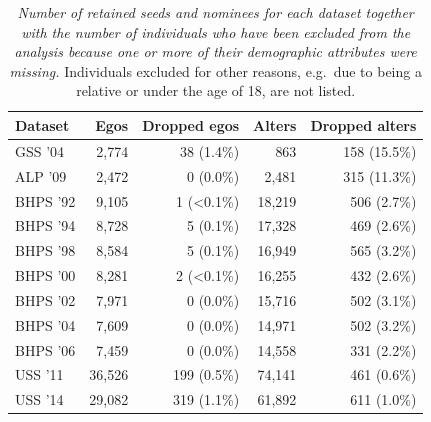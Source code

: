 \documentclass{scrartcl}
\newcommand{\titlecaption}[2]{\caption[#1]{\emph{#1} #2}}
\begin{document}
\begin{refsection}
\begin{table}
    \begin{tabularx}{\columnwidth}{lrrrr}
        \toprule %
        Dataset & Egos & Dropped egos & Alters & Dropped alters \\
        \midrule %
        GSS '04 & 2,774 & 38 (1.4\%) & 863 & 158 (15.5\%)\\
        ALP '09 & 2,472 & 0 (0.0\%) & 2,481 & 315 (11.3\%)\\
        BHPS '92 & 9,105 & 1 (\textless 0.1\%) & 18,219 & 506 (2.7\%)\\
        BHPS '94 & 8,728 & 5 (0.1\%) & 17,328 & 469 (2.6\%)\\
        BHPS '98 & 8,584 & 5 (0.1\%) & 16,949 & 565 (3.2\%)\\
        BHPS '00 & 8,281 & 2 (\textless 0.1\%) & 16,255 & 432 (2.6\%)\\
        BHPS '02 & 7,971 & 0 (0.0\%) & 15,716 & 502 (3.1\%)\\
        BHPS '04 & 7,609 & 0 (0.0\%) & 14,971 & 502 (3.2\%)\\
        BHPS '06 & 7,459 & 0 (0.0\%) & 14,558 & 331 (2.2\%)\\
        USS '11 & 36,526 & 199 (0.5\%) & 74,141 & 461 (0.6\%)\\
        USS '14 & 29,082 & 319 (1.1\%) & 61,892 & 611 (1.0\%)\\
        \bottomrule %
    \end{tabularx}
    \titlecaption{Number of retained seeds and nominees for each dataset together with the number of individuals who have been excluded from the analysis because one or more of their demographic attributes were missing.}{Individuals excluded for other reasons, e.g.\ due to being a relative or under the age of 18, are not listed.\label{tbl:survey-sample-size}}
\end{table}


\end{refsection}
\end{document}
